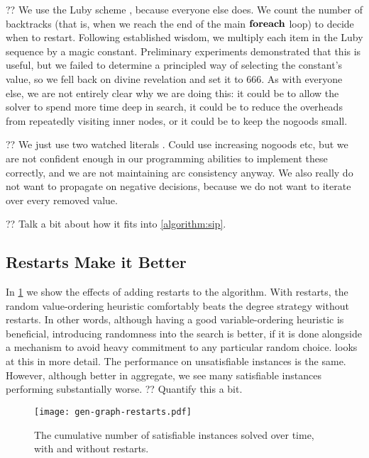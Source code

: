 \documentclass{article}
\newcommand{\citep}[1]{\cite{#1}}
\begin{document}
?? We use the Luby scheme \citep{DBLP:journals/ipl/LubySZ93}, because everyone else does. We count
the number of backtracks (that is, when we reach the end of the main $\KwSty{foreach}$ loop) to
decide when to restart. Following established wisdom, we multiply each item in the Luby sequence by
a magic constant. Preliminary experiments demonstrated that this is useful, but we failed to
determine a principled way of selecting the constant's value, so we fell back on divine revelation
and set it to 666. As with everyone else, we are not entirely clear why we are doing this: it could
be to allow the solver to spend more time deep in search, it could be to reduce the overheads from
repeatedly visiting inner nodes, or it could be to keep the nogoods small.

?? We just use two watched literals \citep{DBLP:conf/dac/MoskewiczMZZM01}. Could use increasing
nogoods \citep{DBLP:conf/aaai/LeeSZ16,DBLP:conf/cp/GlorianBLLM17} etc, but we are not confident enough
in our programming abilities to implement these correctly, and we are not maintaining arc
consistency anyway. We also really do not want to propagate on negative decisions, because we do not
want to iterate over every removed value.

?? Talk a bit about how it fits into \cref{algorithm:sip}.

\subsection{Restarts Make it Better}

In \cref{figure:restarts} we show the effects of adding restarts to the algorithm. With restarts,
the random value-ordering heuristic comfortably beats the degree strategy without restarts. In
other words, although having a good variable-ordering heuristic is beneficial, introducing
randomness into the search is better, if it is done alongside a mechanism to avoid heavy commitment
to any particular random choice.  looks at this in more detail.  The
performance on unsatisfiable instances is the same. However, although better in aggregate, we see
many satisfiable instances performing substantially worse. ?? Quantify this a bit.

\begin{figure}[p]
    \centering
    \texttt{[image: gen-graph-restarts.pdf]}

    \caption{The cumulative number of satisfiable instances solved over time, with and without
    restarts.}
    \label{figure:restarts}
\end{figure}
\end{document}

